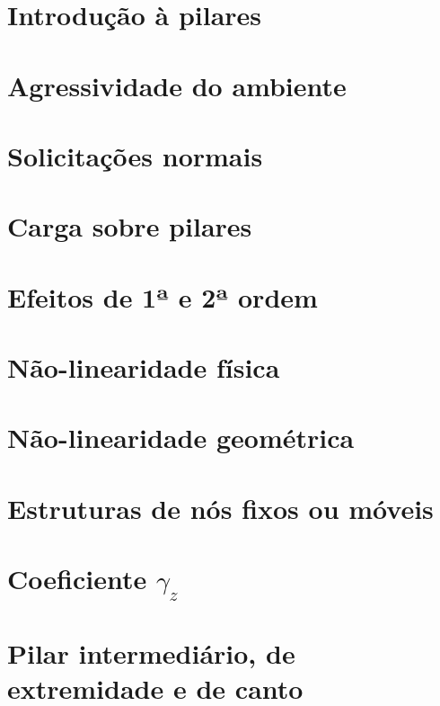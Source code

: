 \documentclass[12pt, a4paper]{article}
\begin{document}
	

	\section{Introdução à pilares}
	

	\section{Agressividade do ambiente}
	

	\section{Solicitações normais}
	

	\section{Carga sobre pilares}
	

	\section{Efeitos de 1ª e 2ª ordem}
	

	\section{Não-linearidade física}
	

	\section{Não-linearidade geométrica}
	

	\section{Estruturas de nós fixos ou móveis}
	

	\section{Coeficiente $\gamma_z$}
	

	

	\section{Pilar intermediário, de extremidade e de canto}
	
\end{document}
